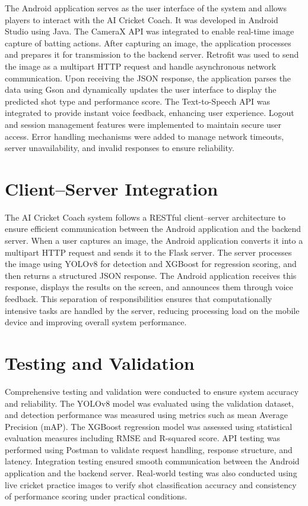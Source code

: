 The Android application serves as the user interface of the system and allows players to interact with the AI Cricket Coach. It was developed in Android Studio using Java. The CameraX API was integrated to enable real-time image capture of batting actions. After capturing an image, the application processes and prepares it for transmission to the backend server. Retrofit was used to send the image as a multipart HTTP request and handle asynchronous network communication. Upon receiving the JSON response, the application parses the data using Gson and dynamically updates the user interface to display the predicted shot type and performance score. The Text-to-Speech API was integrated to provide instant voice feedback, enhancing user experience. Logout and session management features were implemented to maintain secure user access. Error handling mechanisms were added to manage network timeouts, server unavailability, and invalid responses to ensure reliability.

\section{Client–Server Integration} \label{S6.7}

The AI Cricket Coach system follows a RESTful client–server architecture to ensure efficient communication between the Android application and the backend server. When a user captures an image, the Android application converts it into a multipart HTTP request and sends it to the Flask server. The server processes the image using YOLOv8 for detection and XGBoost for regression scoring, and then returns a structured JSON response. The Android application receives this response, displays the results on the screen, and announces them through voice feedback. This separation of responsibilities ensures that computationally intensive tasks are handled by the server, reducing processing load on the mobile device and improving overall system performance.

\section{Testing and Validation} \label{S6.8}

Comprehensive testing and validation were conducted to ensure system accuracy and reliability. The YOLOv8 model was evaluated using the validation dataset, and detection performance was measured using metrics such as mean Average Precision (mAP). The XGBoost regression model was assessed using statistical evaluation measures including RMSE and R-squared score. API testing was performed using Postman to validate request handling, response structure, and latency. Integration testing ensured smooth communication between the Android application and the backend server. Real-world testing was also conducted using live cricket practice images to verify shot classification accuracy and consistency of performance scoring under practical conditions.


